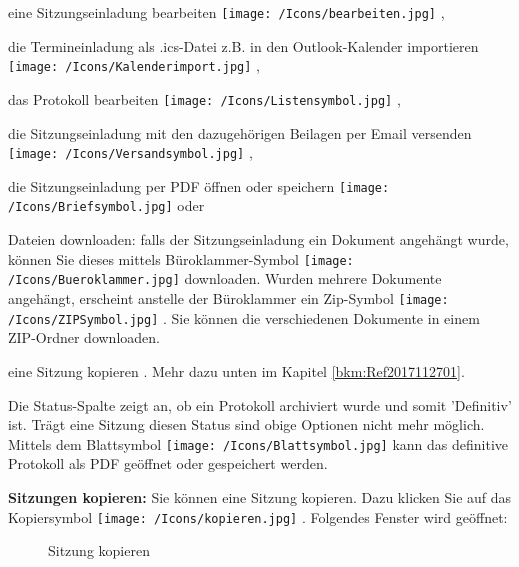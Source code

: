 \begin{compactitem}
	\item eine Sitzungseinladung bearbeiten \texttt{[image: /Icons/bearbeiten.jpg]} ,
	\item die Termineinladung als .ics-Datei z.B. in den Outlook-Kalender importieren \texttt{[image: /Icons/Kalenderimport.jpg]} ,
	\item das Protokoll bearbeiten \texttt{[image: /Icons/Listensymbol.jpg]} ,
	\item die Sitzungseinladung mit den dazugehörigen Beilagen per Email versenden \texttt{[image: /Icons/Versandsymbol.jpg]} ,
	\item die Sitzungseinladung per PDF öffnen oder speichern \texttt{[image: /Icons/Briefsymbol.jpg]}  oder
	\item Dateien downloaden: falls der Sitzungseinladung ein Dokument angehängt wurde, können Sie dieses mittels Büroklammer-Symbol \texttt{[image: /Icons/Bueroklammer.jpg]}  downloaden. Wurden mehrere Dokumente angehängt, erscheint anstelle der Büroklammer ein Zip-Symbol \texttt{[image: /Icons/ZIPSymbol.jpg]} . Sie können die verschiedenen Dokumente in einem ZIP-Ordner downloaden.
	\item eine Sitzung kopieren . Mehr dazu unten im Kapitel \ref{bkm:Ref2017112701}.
	\end{compactitem}
	
Die Status-Spalte  zeigt an, ob ein Protokoll archiviert wurde und somit 'Definitiv' ist. Trägt eine Sitzung diesen Status sind obige Optionen nicht mehr möglich. Mittels dem Blattsymbol \texttt{[image: /Icons/Blattsymbol.jpg]} kann das definitive Protokoll als PDF geöffnet oder gespeichert werden.
	
\vspace{\baselineskip}
\label{bkm:Ref2017112701}

\textbf{Sitzungen kopieren:} Sie können eine Sitzung kopieren. Dazu klicken Sie auf das Kopiersymbol \texttt{[image: /Icons/kopieren.jpg]} . Folgendes Fenster wird geöffnet: 

\begin{figure}[H]
\caption{Sitzung kopieren}
\end{figure}

